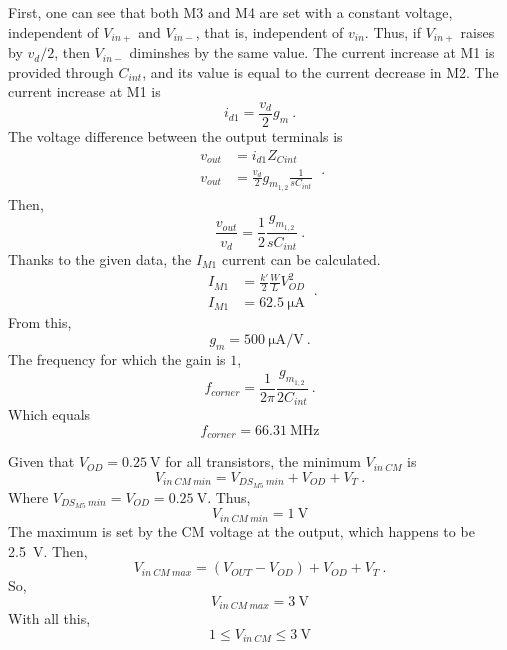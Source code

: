 First, one can see that both M3 and M4 are set with a constant voltage, independent of $V_{in+}$ and $V_{in-}$, that is, independent of $v_{in}$. Thus, if $V_{in+}$ raises by $v_d/2$, then $V_{in-}$ diminshes by the same value. The current increase at M1 is provided through $C_{int}$, and its value is equal to the current decrease in M2. The current increase at M1 is 
\begin{equation}
   i_{d1} = \frac{v_d}{2}g_m \ .
\end{equation}
The voltage difference between the output terminals is 
\begin{equation}
	\begin{split}
   		v_{out} &= i_{d1} Z_{Cint} \\
   		v_{out} &= \frac{v_d}{2} g_{m_{1,2}} \frac{1}{s C_{int}}
	\end{split} \ .
\end{equation}
Then,
\begin{equation}
   \frac{v_{out}}{v_d} = \frac{1}{2} \frac{g_{m_{1,2}}}{s C_{int}} \ .
\end{equation}
Thanks to the given data, the $I_{M1}$ current can be calculated. 
\begin{equation}
   \begin{split}
	  I_{M1} &= \frac{k'}{2} \frac{W}{L} V_{OD}^2 \\
	  I_{M1} &= \SI{62.5}{\uA}
   \end{split} \ .
\end{equation}
From this, 
\begin{equation}
   g_m = \SI{500}{\uA/\V} \ .
\end{equation}\label{eq:fcorner}
The frequency for which the gain is $1$,
\begin{equation}
   f_{corner} = \frac{1}{2 \pi} \frac{g_{m_{1,2}}}{2 C_{int}} \ .
\end{equation}
Which equals 
\begin{equation}
	\boxed{
		f_{corner} = \SI{66.31}{\MHz}
	}
\end{equation}

Given that $V_{OD} = \SI{0.25}{\V}$ for all transistors, the minimum $V_{in \ CM}$ is 
\begin{equation}
   V_{in \ CM \ min} = V_{DS_{M5} \ min} + V_{OD} + V_{T} \ .
\end{equation}
Where $ V_{DS_{M5} \ min} = V_{OD} = \SI{0.25}{\V}$. Thus,
\begin{equation}
	\boxed{
   		V_{in \ CM \ min} = \SI{1}{\V}
	}
\end{equation}
The maximum is set by the CM voltage at the output, which happens to be \SI{2.5}{\V}. Then,
\begin{equation}
   V_{in \ CM \ max} = \left(V_{OUT} - V_{OD}\right) + V_{OD} + V_T \ .
\end{equation}
So,
\begin{equation}
	\boxed{
   		V_{in \ CM \ max} = \SI{3}{\V}
	}
\end{equation}
With all this,
\begin{equation}
	\boxed{
   		1 \leq V_{in \ CM} \leq \SI{3}{\V}
	}
\end{equation}


